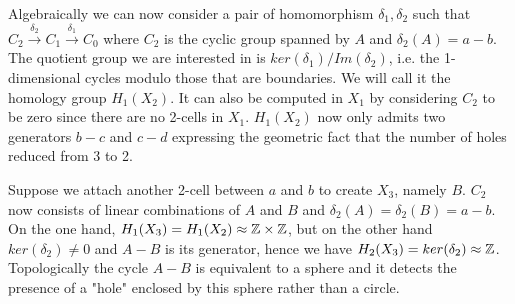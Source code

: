 \documentclass[12pt, a4paper]{article}
\begin{document}
Algebraically we can now consider a pair of homomorphism $\delta_1, \delta_2$ such that $C_2 \xrightarrow{\delta_2} C_1 \xrightarrow{\delta_1} C_0$ where $C_2$ is the cyclic group spanned by $A$ and $\delta_2(A) = a-b$. The quotient group we are interested in is $ker(\delta_1)/Im(\delta_2)$, i.e. the 1-dimensional cycles modulo those that are boundaries. We will call it the homology group $H_1(X_2)$. It can also be computed in $X_1$ by considering $C_2$ to be zero since there are no 2-cells in $X_1$. $H_1(X_2)$ now only admits two generators $b-c$ and $c - d$ expressing the geometric fact that the number of holes reduced from 3 to 2.\\


\begin{center}
\end{center}

Suppose we attach another 2-cell between $a$ and $b$ to create $X_3$, namely $B$. $C_2$ now consists of linear combinations of $A$ and $B$ and $\delta_2(A) = \delta_2(B) = a-b$. On the one hand, $H_1(X_3) = H_1(X_2) \approx \mathbb{Z} \times \mathbb{Z}$, but on the other hand $ker(\delta_2) \neq 0$ and $A-B$ is its generator, hence we have $H_2(X_3) = ker(\delta_2) \approx \mathbb{Z}$. Topologically the cycle $A-B$ is equivalent to a sphere and it detects the presence of a "hole" enclosed by this sphere rather than a circle.\\
\end{document}
